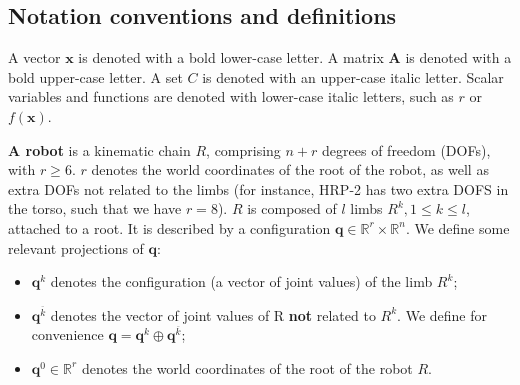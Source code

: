 \subsection{Notation conventions and definitions} \label{notations}

A vector  $\mathbf{x}$ is denoted with a bold lower-case letter.
A matrix $\mathbf{A}$ is denoted with a bold upper-case letter.
A set $C$ is denoted with an upper-case italic letter.
Scalar variables and functions are denoted with lower-case italic letters, such as
$r$ or $f(\textbf{x})$.



\medskip
\textbf{A robot} is a kinematic chain $R$, comprising \mbox{$n + r$} degrees of freedom (DOFs), with $r \geq 6$. $r$ denotes the world coordinates of the root of the robot,
as well as extra DOFs not related to the limbs (for instance, HRP-2 has two extra DOFS in the torso, such that we have $r=8$). 
$R$ is composed of $l$ limbs $R^k, 1 \leq k \leq l$, attached to a root.
It is described by a configuration $\mathbf{q} \in  \mathbb{R}^r \times \mathbb{R}^n$.
We define some relevant projections of $\mathbf{q}$:
\begin{itemize}
	\item $\mathbf{q}^k$ denotes the configuration (a vector of joint values) of the limb $R^k$; %
	\item $\mathbf{q}^{\overline{k}}$ denotes the vector of joint values of R \textbf{not} related to $R^k$. We define for convenience \mbox{$\mathbf{q}= \mathbf{q}^k \oplus \mathbf{q}^{\overline{k}}$}; %
	\item $\mathbf{q}^{0}\in \mathbb{R}^r$ denotes the world coordinates of the root of the robot $R$.
\end{itemize}

